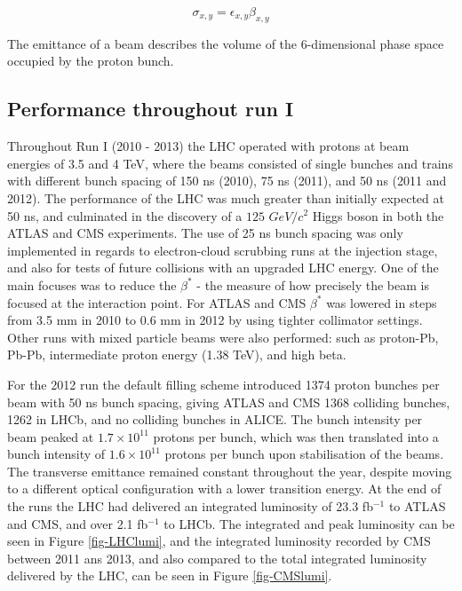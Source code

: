 \begin{equation} \label{eqn-beamsize}
\sigma_{x,y}=\epsilon_{x,y}\beta_{x,y}
\end{equation}

The emittance of a beam describes the volume of the 6-dimensional phase space occupied by the proton bunch.

\subsection{Performance throughout run I}

Throughout Run I (2010 - 2013) the LHC operated with protons at beam energies of 3.5 and 4 TeV, where the beams consisted of single bunches and trains with different bunch spacing of 150 ns (2010), 75 ns (2011), and 50 ns (2011 and 2012). The performance of the LHC was much greater than initially expected at 50 ns, and culminated in the discovery of a $125$ $GeV/c^2$ Higgs boson in both the ATLAS \cite{ATLASHiggs} and CMS \cite{CMSHiggs} experiments. The use of 25 ns bunch spacing was only implemented in regards to electron-cloud scrubbing runs at the injection stage, and also for tests of future collisions with an upgraded LHC energy. One of the main focuses was to reduce the $\beta^*$ - the measure of how precisely the beam is focused at the interaction point. For ATLAS and CMS $\beta^*$ was lowered in steps from 3.5 mm in 2010 to 0.6 mm in 2012 by using tighter collimator settings. Other runs with mixed particle beams were also performed: such as proton-Pb, Pb-Pb, intermediate proton energy (1.38 TeV), and high beta.

For the 2012 run the default filling scheme introduced 1374 proton bunches per beam with 50 ns bunch spacing, giving ATLAS and CMS 1368 colliding bunches, 1262 in LHCb, and no colliding bunches in ALICE. The bunch intensity per beam peaked at $1.7 \times 10^{11}$ protons per bunch, which was then translated into a bunch intensity of $1.6 \times 10^{11}$ protons per bunch upon stabilisation of the beams. The transverse emittance remained constant throughout the year, despite moving to a different optical configuration with a lower transition energy. At the end of the runs the LHC had delivered an integrated luminosity of 23.3 fb$^{-1}$ to ATLAS and CMS, and over 2.1 fb$^{-1}$ to LHCb. The integrated and peak luminosity can be seen in Figure \ref{fig-LHClumi}, and the integrated luminosity recorded by CMS between 2011 ans 2013, and also compared to the total integrated luminosity delivered by the LHC, can be seen in Figure \ref{fig-CMSlumi}.

